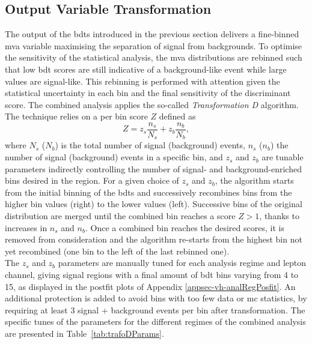 \subsection{Output Variable Transformation}
The output of the \gls{bdt}s introduced in the previous section delivers a fine-binned \gls{mva} variable maximising the separation of signal from backgrounds. To optimise the sensitivity of the statistical analysis, the \gls{mva} distributions are rebinned such that low \gls{bdt} scores are still indicative of a background-like event while large values are signal-like. This rebinning is performed with attention given the statistical uncertainty in each bin and the final sensitivity of the discriminant score. The combined analysis applies the so-called \textit{Transformation D} algorithm. The technique relies on a per bin score $Z$ defined as
\begin{equation}
    Z = z_s \frac{n_s}{N_s} + z_b \frac{n_b}{N_b},
\end{equation} 
where $N_s$ ($N_b$) is the total number of signal (background) events, $n_s$ ($n_b$) the number of signal (background) events in a specific bin, and $z_s$ and $z_b$ are tunable parameters indirectly controlling the number of signal- and background-enriched bins desired in the region. For a given choice of $z_s$ and $z_b$, the algorithm starts from the initial binning of the \gls{bdt}s and successively recombines bins from the higher bin values (right) to the lower values (left). Successive bins of the original distribution are merged until the combined bin reaches a score $Z > 1$, thanks to increases in $n_s$ and $n_b$. Once a combined bin reaches the desired scores, it is removed from consideration and the algorithm re-starts from the highest bin not yet recombined (one bin to the left of the last rebinned one).\\

The $z_s$ and $z_b$ parameters are manually tuned for each analysis regime and lepton channel, giving signal regions with a final amount of \gls{bdt} bins varying from 4 to 15, as displayed in the postfit plots of Appendix \ref{appsec-vh-analRegPosfit}. An additional protection is added to avoid bins with too few data or \gls{mc} statistics, by requiring at least 3 signal + background events per bin after transformation. The specific tunes of the parameters for the different regimes of the combined analysis are presented in Table~\ref{tab:trafoDParams}.

